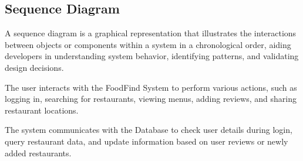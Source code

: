 \documentclass[12pt, a4paper, oneside]{article}
\begin{document}





\subsection{Sequence Diagram}
A sequence diagram is a graphical representation that illustrates the interactions between objects or components within a system in a chronological order, aiding developers in understanding system behavior, identifying patterns, and validating design decisions.

The user interacts with the FoodFind System to perform various actions, such as logging in, searching for restaurants, viewing menus, adding reviews, and sharing restaurant locations.

The system communicates with the Database to check user details during login, query restaurant data, and update information based on user reviews or newly added restaurants.
\end{document}
